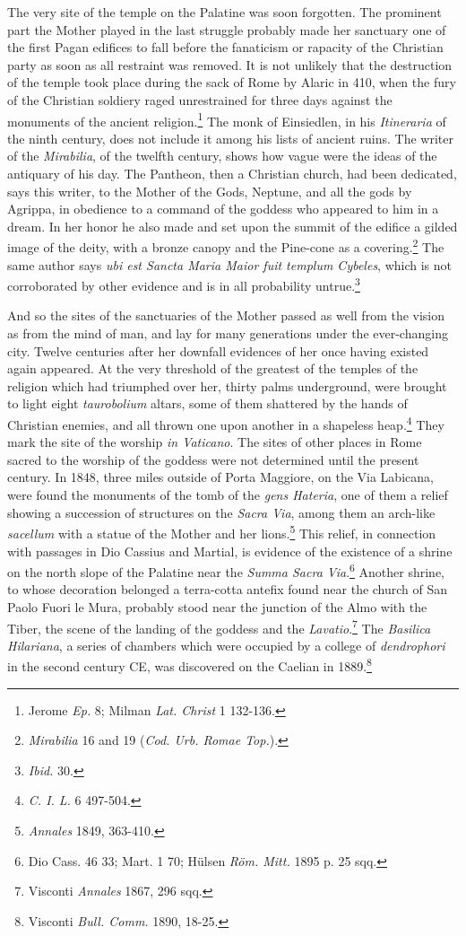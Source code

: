 \documentclass[a4paper, 11pt, oneside, polutonikogreek, english]{article}
\begin{document}
The very site of the temple on the Palatine was soon forgotten. The prominent part the Mother played in the last struggle probably made her sanctuary one of the first Pagan edifices to fall before the fanaticism or rapacity of the Christian party as soon as all restraint was removed. It is not unlikely that the destruction of the temple took place during the sack of Rome by Alaric in 410, when the fury of the Christian soldiery raged unrestrained for three days against the monuments of the ancient religion.\footnote{Jerome \emph{Ep.} 8; Milman \emph{Lat. Christ} 1 132-136.} The monk of Einsiedlen, in his \emph{Itineraria} of the ninth century, does not include it among his lists of ancient ruins. The writer of the \emph{Mirabilia}, of the twelfth century, shows how vague were the ideas of the antiquary of his day. The Pantheon, then a Christian church, had been dedicated, says this writer, to the Mother of the Gods, Neptune, and all the gods by Agrippa, in obedience to a command of the goddess who appeared to him in a dream. In her honor he also made and set upon the summit of the edifice a gilded image of the deity, with a bronze canopy and the Pine-cone as a covering.\footnote{\emph{Mirabilia} 16 and 19 (\emph{Cod. Urb. Romae Top.}).} The same author says \emph{ubi est Sancta Maria Maior fuit templum Cybeles}, which is not corroborated by other evidence and is in all probability untrue.\footnote{\emph{Ibid.} 30.}

And so the sites of the sanctuaries of the Mother passed as well from the vision as from the mind of man, and lay for many generations under the ever-changing city. Twelve centuries after her downfall evidences of her once having existed again appeared. At the very threshold of the greatest of the temples of the religion which had triumphed over her, thirty palms underground, were brought to light eight \emph{taurobolium} altars, some of them shattered by the hands of Christian enemies, and all thrown one upon another in a shapeless heap.\footnote{\emph{C. I. L.} 6 497-504.} They mark the site of the worship \emph{in Vaticano}. The sites of other places in Rome sacred to the worship of the goddess were not determined until the present century. In 1848, three miles outside of Porta Maggiore, on the Via Labicana, were found the monuments of the tomb of the \emph{gens Hateria}, one of them a relief showing a succession of structures on the \emph{Sacra Via}, among them an arch-like \emph{sacellum} with a statue of the Mother and her lions.\footnote{\emph{Annales} 1849, 363-410.} This relief, in connection with passages in Dio Cassius and Martial, is evidence of the existence of a shrine on the north slope of the Palatine near the \emph{Summa Sacra Via}.\footnote{Dio Cass. 46 33; Mart. 1 70; Hülsen \emph{Röm. Mitt.} 1895 p. 25 sqq.} Another shrine, to whose decoration belonged a terra-cotta antefix found near the church of San Paolo Fuori le Mura, probably stood near the junction of the Almo with the Tiber, the scene of the landing of the goddess and the \emph{Lavatio}.\footnote{Visconti \emph{Annales} 1867, 296 sqq.} The \emph{Basilica Hilariana}, a series of chambers which were occupied by a college of \emph{dendrophori} in the second century \textsc{CE}, was discovered on the Caelian in 1889.\footnote{Visconti \emph{Bull. Comm.} 1890, 18-25.}
\end{document}
